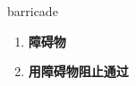 
\begin{frame}
{\huge barricade}
\begin{center}
\begin{enumerate}\Large
  \item \textbf{障碍物}
  \item \textbf{用障碍物阻止通过}
\end{enumerate}
\end{center}
\end{frame}
